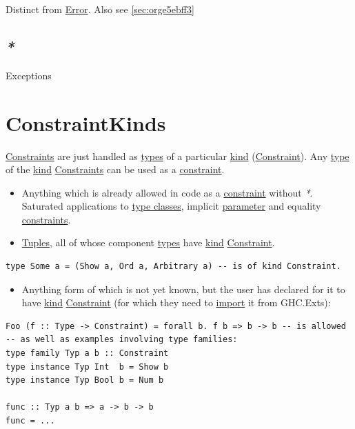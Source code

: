 \documentclass[a4paper,14pt,oneside]{book}
\begin{document}
Distinct from \hyperref[org9b8c650]{Error}. Also see \ref{sec:orge5ebff3}

\section{\emph{*}}
\label{sec:org1707bb2}

\label{org066211f}Exceptions

\chapter{\label{orgd007dd6}ConstraintKinds}
\label{sec:org34ed528}
\hyperref[org49cc369]{Constraints} are just handled as \hyperref[org4ecdb92]{types} of a particular \hyperref[org69696e5]{kind} (\hyperref[orgf3eb9ed]{Constraint}).
Any \hyperref[org86803a3]{type} of the \hyperref[org69696e5]{kind} \hyperref[org49cc369]{Constraints} can be used as a \hyperref[orgf3eb9ed]{constraint}.
\begin{itemize}
\item Anything which is already allowed in code as a \hyperref[orgf3eb9ed]{constraint} without \emph{*}. Saturated applications to \hyperref[org34c8b88]{type classes}, implicit \hyperref[org922ea3c]{parameter} and equality \hyperref[org49cc369]{constraints}.
\item \hyperref[org6cc3a54]{Tuples}, all of whose component \hyperref[org4ecdb92]{types} have \hyperref[org69696e5]{kind} \hyperref[orgf3eb9ed]{Constraint}.
\end{itemize}
\begin{verbatim}
type Some a = (Show a, Ord a, Arbitrary a) -- is of kind Constraint.
\end{verbatim}
\begin{itemize}
\item Anything form of which is not yet known, but the user has declared for it to have \hyperref[org69696e5]{kind} \hyperref[orgf3eb9ed]{Constraint} (for which they need to \hyperref[orgceacf19]{import} it from GHC.Exts):
\end{itemize}
\begin{verbatim}
Foo (f :: Type -> Constraint) = forall b. f b => b -> b -- is allowed
-- as well as examples involving type families:
type family Typ a b :: Constraint
type instance Typ Int  b = Show b
type instance Typ Bool b = Num b

func :: Typ a b => a -> b -> b
func = ...
\end{verbatim}
\end{document}

